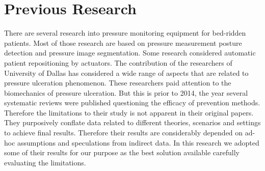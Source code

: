 \section{Previous Research}
There are several research into pressure monitoring equipment for bed-ridden patients. Most of those research are based on pressure measurement posture detection and pressure image segmentation. Some research considered automatic patient repositioning by actuators. The contribution of the researchers of University of Dallas has considered a wide range of aspects that are related to pressure ulceration phenomenon. These researchers paid attention to the biomechanics of pressure ulceration. But this is prior to 2014, the year several systematic reviews were published questioning the efficacy of prevention methods. Therefore the limitations to their study is not apparent in their original papers. They purposively conflate data related to different theories, scenarios and settings to achieve final results. Therefore their results are considerably depended on ad-hoc assumptions and speculations from indirect data. In this research we adopted some of their results for our purpose as the best solution available carefully evaluating the limitations.


